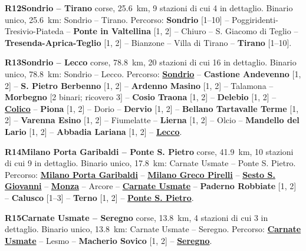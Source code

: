 \medskip\noindent\hypertarget{lin:R12}{\textbf{R12\enspace Sondrio -- Tirano}} corse, \SI{25,6}{\km}, 9 stazioni di cui 4 in dettaglio. Binario unico, \SI{25,6}{\km}: Sondrio -- Tirano. Percorso: \hypertarget{sta:S01430}{\textbf{Sondrio}} [1--10] -- Poggiridenti-Tresivio-Piateda -- \hypertarget{sta:S01434}{\textbf{Ponte in Valtellina}} [1, 2] -- Chiuro -- S. Giacomo di Teglio -- \hypertarget{sta:S01437}{\textbf{Tresenda-Aprica-Teglio}} [1, 2] -- Bianzone -- Villa di Tirano -- \hypertarget{sta:S01440}{\textbf{Tirano}} [1--10].

\medskip\noindent\hypertarget{lin:R13}{\textbf{R13\enspace Sondrio -- Lecco}} corse, \SI{78,8}{\km}, 20 stazioni di cui 16 in dettaglio. Binario unico, \SI{78,8}{\km}: Sondrio -- Lecco. Percorso: \hyperlink{sta:S01430}{\textbf{Sondrio}} -- \hypertarget{sta:S01429}{\textbf{Castione Andevenno}} [1, 2] -- \hypertarget{sta:S01428}{\textbf{S. Pietro Berbenno}} [1, 2] -- \hypertarget{sta:S01427}{\textbf{Ardenno Masino}} [1, 2] -- Talamona -- \hypertarget{sta:S01425}{\textbf{Morbegno}} [2 binari; ricovero 3] -- \hypertarget{sta:S01424}{\textbf{Cosio Traona}} [1, 2] -- \hypertarget{sta:S01422}{\textbf{Delebio}} [1, 2] -- \hyperlink{sta:S01420}{\textbf{Colico}} -- \hypertarget{sta:S01406}{\textbf{Piona}} [1, 2] -- Dorio -- \hypertarget{sta:S01408}{\textbf{Dervio}} [1, 2] -- \hypertarget{sta:S01409}{\textbf{Bellano Tartavalle Terme}} [1, 2] -- \hypertarget{sta:S01411}{\textbf{Varenna Esino}} [1, 2] -- Fiumelatte -- \hypertarget{sta:S01413}{\textbf{Lierna}} [1, 2] -- Olcio -- \hypertarget{sta:S01415}{\textbf{Mandello del Lario}} [1, 2] -- \hypertarget{sta:S01416}{\textbf{Abbadia Lariana}} [1, 2] -- \hyperlink{sta:S01520}{\textbf{Lecco}}.

\medskip\noindent\hypertarget{lin:R14}{\textbf{R14\enspace Milano Porta Garibaldi -- Ponte S. Pietro}} corse, \SI{41,9}{\km}, 10 stazioni di cui 9 in dettaglio. Binario unico, \SI{17,8}{\km}: Carnate Usmate -- Ponte S. Pietro. Percorso: \hyperlink{sta:S01645}{\textbf{Milano Porta Garibaldi}} -- \hyperlink{sta:S01326}{\textbf{Milano Greco Pirelli}} -- \hyperlink{sta:S01325}{\textbf{Sesto S. Giovanni}} -- \hyperlink{sta:S01322}{\textbf{Monza}} -- Arcore -- \hyperlink{sta:S01511}{\textbf{Carnate Usmate}} -- \hypertarget{sta:S01502}{\textbf{Paderno Robbiate}} [1, 2] -- \hypertarget{sta:S01503}{\textbf{Calusco}} [1--3] -- \hypertarget{sta:S01504}{\textbf{Terno}} [1, 2] -- \hyperlink{sta:S01528}{\textbf{Ponte S. Pietro}}.

\medskip\noindent\hypertarget{lin:R15}{\textbf{R15\enspace Carnate Usmate -- Seregno}} corse, \SI{13,8}{\km}, 4 stazioni di cui 3 in dettaglio. Binario unico, \SI{13,8}{\km}: Carnate Usmate -- Seregno. Percorso: \hyperlink{sta:S01511}{\textbf{Carnate Usmate}} -- Lesmo -- \hypertarget{sta:S01500}{\textbf{Macherio Sovico}} [1, 2] -- \hyperlink{sta:S01318}{\textbf{Seregno}}.

